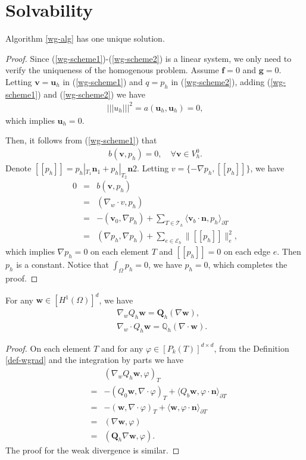 \documentclass[leqno]{siamltex704}
\numberwithin{equation}{section}
\def\E{{\mathcal{E}}}
\def\dQ{{\mathbb{Q}}}
\def\bQ{{\mathbf{Q}}}
\def\sumT{\sum_{T\in\mathcal{T}_h}}     %
\def\sumE{\sum_{e\in\E_h}}            %
\def\trb{|\!|\!|}
\def\la{\langle}
\def\ra{\rangle_{\partial T}}
\def\bw{{\mathbf{w}}}
\def\bu{{\mathbf{u}}}
\def\bv{{\mathbf{v}}}
\def\bn{{\mathbf{n}}}
\def\bf{{\mathbf{f}}}
\def\bg{{\mathbf{g}}}
\begin{document}
\section{Solvability}
\begin{lemma}
  Algorithm \ref{wg-alg} has one unique solution.
\end{lemma}
\begin{proof}
  Since (\ref{wg-scheme1})-(\ref{wg-scheme2}) is a linear system, we only need to verify the
  uniqueness of the homogenous problem. Assume $\bf=0$ and $\bg=0$. Letting $\bv=\bu_h$ in (\ref{wg-scheme1})
  and $q=p_h$ in (\ref{wg-scheme2}), adding (\ref{wg-scheme1}) and (\ref{wg-scheme2}) we have
  \begin{eqnarray*}
    \trb u_h\trb ^2 = a(\bu_h,\bu_h) = 0,
  \end{eqnarray*}
  which implies $\bu_h = 0$.

  Then, it follows from (\ref{wg-scheme1}) that
  \begin{eqnarray*}
    b(\bv,p_h) = 0 ,\quad \forall \bv\in V_h^0.
  \end{eqnarray*}
  Denote $[\![ p_h ]\!] = p_h|_{T_1}\bn_1+p_h|_{T_2}\bn2$. Letting $v = \{-\nabla p_h,[\![ p_h ]\!]\}$,
  we have
  \begin{eqnarray*}
    0 &=& b(\bv,p_h)
    \\
    &=& (\nabla_w\cdot v,p_h)
    \\
    &=& -(\bv_0,\nabla p_h) + \sumT\la \bv_b\cdot\bn,p_h\ra
    \\
    &=& (\nabla p_h,\nabla p_h) + \sumE \|[\![ p_h ]\!]\|_e^2,
  \end{eqnarray*}
  which implies $\nabla p_h=0$ on each element $T$ and $[\![ p_h ]\!]=0$ on each edge $e$.
  Then $p_h$ is a constant. Notice that $\int_\Omega p_h=0$, we have $p_h=0$, which completes the proof.
\end{proof}

\begin{lemma}\label{commu-prop}
  For any $\bw\in [H^1(\Omega)]^d$, we have
  \begin{eqnarray*}
    &&\nabla_w Q_h \bw = \bQ_h(\nabla \bw),
    \\
    && \nabla_w \cdot Q_h \bw = \dQ_h(\nabla\cdot \bw).
  \end{eqnarray*}
\end{lemma}
\begin{proof}
  On each element $T$ and for any $\varphi\in [P_k(T)]^{d\times d}$, from the Definition \ref{def-wgrad}
  and the integration by parts we have
  \begin{eqnarray*}
    &&(\nabla_w Q_h \bw,\varphi)_T
    \\
    &=& -(Q_0\bw,\nabla\cdot\varphi)_T +\la Q_b\bw,\varphi\cdot\bn\ra
    \\
    &=& -(\bw,\nabla\cdot\varphi)_T +\la \bw,\varphi\cdot\bn\ra
    \\
    &=& (\nabla \bw,\varphi)
    \\
    &=& (\bQ_h\nabla\bw,\varphi).
  \end{eqnarray*}
  The proof for the weak divergence is similar.
\end{proof}
\end{document}
